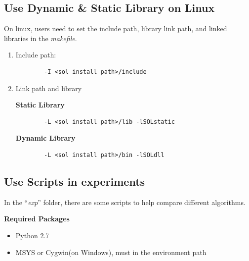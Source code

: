 \documentclass[11pt,a4paper]{article}
\newlength{\wideitemsep}
\let\olditem\item
\renewcommand{\item}{\setlength{\itemsep}{\wideitemsep}\olditem}
\begin{document}
\begin{enumerate}
\begin{lstlisting}
        \end{lstlisting}
\end{enumerate}

\subsection{Use Dynamic \& Static Library on Linux}
On linux, users need to set the include path, library link path, and linked
libraries in the \emph{makefile}. 
\begin{enumerate}
    \item Include path: 
        \lstset{language=C++, 
            framexleftmargin=-1.5cm,
            xleftmargin=-1.5cm,
        }   
        \begin{lstlisting}
        -I <sol install path>/include
        \end{lstlisting}
    \item Link path and library

        \textbf{Static Library}
        \lstset{language=bash}
        \begin{lstlisting}
        -L <sol install path>/lib -lSOLstatic
        \end{lstlisting}
        \textbf{Dynamic Library}
        \lstset{language=bash}
        \begin{lstlisting}
        -L <sol install path>/bin -lSOLdll
        \end{lstlisting}
\end{enumerate}

\lstset{language=C++, 
    framexleftmargin=-1cm,
    xleftmargin=-1cm,
}
\subsection{Use Scripts in experiments}
In the ``\emph{exp}'' folder, there are some scripts to help compare different
algorithms.

\vspace{2mm}\hspace{-5mm}\textbf{Required Packages}
\begin{itemize}
    \item Python 2.7 
    \item MSYS or Cygwin(on Windows), must in the environment path
\end{itemize}
\end{document}
